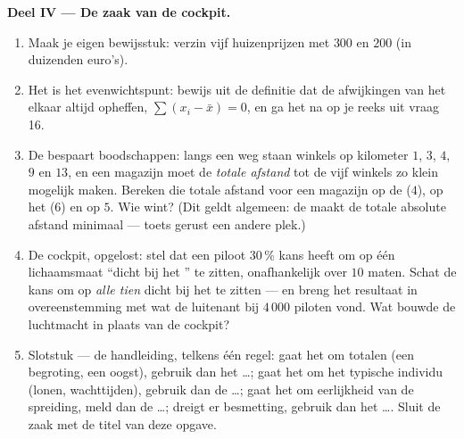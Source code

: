 \begin{problem}
\medskip
\noindent\textbf{Deel IV --- De zaak van de cockpit.}
\begin{enumerate}[resume]
  \item Maak je eigen bewijsstuk: verzin vijf huizenprijzen met 
        $300$ en  $200$ (in duizenden euro's).
  \item Het  is het evenwichtspunt: bewijs uit de definitie dat de
        afwijkingen van het  elkaar altijd opheffen,
        $\sum (x_i - \bar x) = 0$, en ga het na op je reeks uit vraag 16.
  \item De  bespaart boodschappen: langs een weg staan winkels op
        kilometer $1$, $3$, $4$, $9$ en $13$, en een magazijn moet de
        \emph{totale afstand} tot de vijf winkels zo klein mogelijk maken.
        Bereken die totale afstand voor een magazijn op de  ($4$), op
        het  ($6$) en op $5$. Wie wint? (Dit geldt algemeen: de
         maakt de totale absolute afstand minimaal --- toets gerust een
        andere plek.)
  \item De cockpit, opgelost: stel dat een piloot $30\,\%$ kans heeft om op
        één lichaamsmaat ``dicht bij het '' te zitten, onafhankelijk
        over $10$ maten. Schat de kans om op \emph{alle tien} dicht bij het
         te zitten --- en breng het resultaat in overeenstemming met
        wat de luitenant bij $4\,000$ piloten vond. Wat bouwde de luchtmacht
        in plaats van de  cockpit?
  \item Slotstuk --- de handleiding, telkens één regel: gaat het om totalen
        (een begroting, een oogst), gebruik dan het \dots; gaat het om het
        typische individu (lonen, wachttijden), gebruik dan de \dots; gaat het
        om eerlijkheid van de spreiding, meld dan de \dots; dreigt er
        besmetting, gebruik dan het \dots. Sluit de zaak met de titel van deze
        opgave.
\end{enumerate}
\end{problem}
